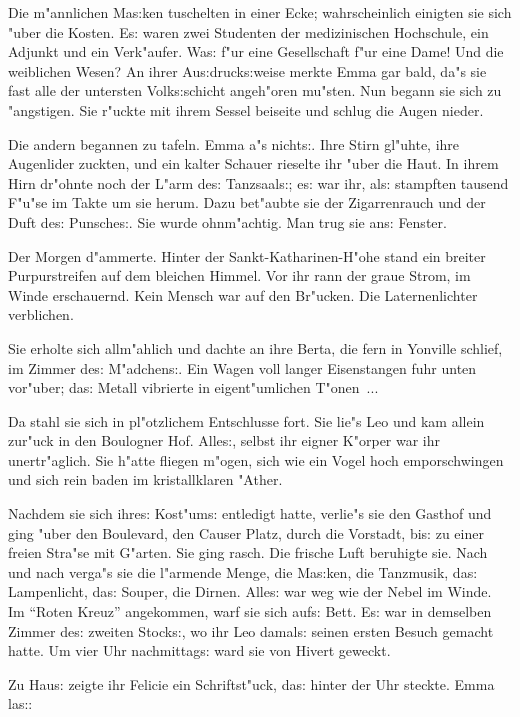 \documentclass[oneside,12pt]{book}
\newcommand{\s}{s:}%
\begin{document}
Die m"annlichen Ma{\s}ken tuschelten in einer Ecke; wahrscheinlich
einigten sie sich "uber die Kosten. E{\s} waren zwei Studenten der
medizinischen Hochschule, ein Adjunkt und ein Verk"aufer. Wa{\s}
f"ur eine Gesellschaft f"ur eine Dame! Und die weiblichen Wesen?
An ihrer Au{\s}druck{\s}weise merkte Emma gar bald, da"s sie fast
alle der untersten Volk{\s}schicht angeh"oren mu"sten. Nun begann
sie sich zu "angstigen. Sie r"uckte mit ihrem Sessel beiseite und
schlug die Augen nieder.

Die andern begannen zu tafeln. Emma a"s nicht{\s}. Ihre Stirn
gl"uhte, ihre Augenlider zuckten, und ein kalter Schauer rieselte
ihr "uber die Haut. In ihrem Hirn dr"ohnte noch der L"arm de{\s}
Tanzsaal{\s}; e{\s} war ihr, al{\s} stampften tausend F"u"se im
Takte um sie herum. Dazu bet"aubte sie der Zigarrenrauch und der
Duft de{\s} Punsche{\s}. Sie wurde ohnm"achtig. Man trug sie
an{\s} Fenster.

Der Morgen d"ammerte. Hinter der Sankt-Katharinen-H"ohe stand ein
breiter Purpurstreifen auf dem bleichen Himmel. Vor ihr rann der
graue Strom, im Winde erschauernd. Kein Mensch war auf den
Br"ucken. Die Laternenlichter verblichen.

Sie erholte sich allm"ahlich und dachte an ihre Berta, die fern in
Yonville schlief, im Zimmer de{\s} M"adchen{\s}. Ein Wagen voll
langer Eisenstangen fuhr unten vor"uber; da{\s} Metall vibrierte
in eigent"umlichen T"onen~...

Da stahl sie sich in pl"otzlichem Entschlusse fort. Sie lie"s Leo
und kam allein zur"uck in den Boulogner Hof. Alle{\s}, selbst ihr
eigner K"orper war ihr unertr"aglich. Sie h"atte fliegen m"ogen,
sich wie ein Vogel hoch emporschwingen und sich rein baden im
kristallklaren "Ather.

Nachdem sie sich ihre{\s} Kost"um{\s} entledigt hatte, verlie"s
sie den Gasthof und ging "uber den Boulevard, den Causer Platz,
durch die Vorstadt, bi{\s} zu einer freien Stra"se mit G"arten.
Sie ging rasch. Die frische Luft beruhigte sie. Nach und nach
verga"s sie die l"armende Menge, die Ma{\s}ken, die Tanzmusik,
da{\s} Lampenlicht, da{\s} Souper, die Dirnen. Alle{\s} war weg
wie der Nebel im Winde. Im "`Roten Kreuz"' angekommen, warf sie
sich auf{\s} Bett. E{\s} war in demselben Zimmer de{\s} zweiten
Stock{\s}, wo ihr Leo damal{\s} seinen ersten Besuch gemacht
hatte. Um vier Uhr nachmittag{\s} ward sie von Hivert geweckt.

Zu Hau{\s} zeigte ihr Felicie ein Schriftst"uck, da{\s} hinter der
Uhr steckte. Emma la{\s}:
\end{document}
